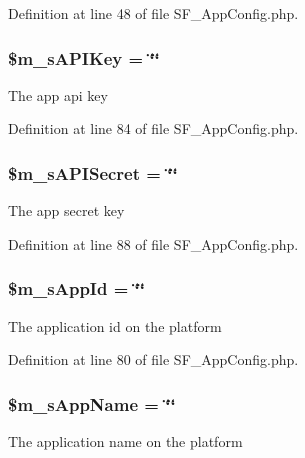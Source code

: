 Definition at line 48 of file SF\_\-AppConfig.php.

\hypertarget{classSF__AppConfig_a47530e961351765a665c4ba63e72ff3d}{
\subsubsection[{\$m\_\-sAPIKey}]{\setlength{\rightskip}{0pt plus 5cm}\$m\_\-sAPIKey = \char`\"{}\char`\"{}}}
\label{classSF__AppConfig_a47530e961351765a665c4ba63e72ff3d}
The app api key 

Definition at line 84 of file SF\_\-AppConfig.php.

\hypertarget{classSF__AppConfig_ad25b743c1731f4d58b617a193538c2b0}{
\subsubsection[{\$m\_\-sAPISecret}]{\setlength{\rightskip}{0pt plus 5cm}\$m\_\-sAPISecret = \char`\"{}\char`\"{}}}
\label{classSF__AppConfig_ad25b743c1731f4d58b617a193538c2b0}
The app secret key 

Definition at line 88 of file SF\_\-AppConfig.php.

\hypertarget{classSF__AppConfig_acd79de47be3cc9eb08fa4190b5d8a8bb}{
\subsubsection[{\$m\_\-sAppId}]{\setlength{\rightskip}{0pt plus 5cm}\$m\_\-sAppId = \char`\"{}\char`\"{}}}
\label{classSF__AppConfig_acd79de47be3cc9eb08fa4190b5d8a8bb}
The application id on the platform 

Definition at line 80 of file SF\_\-AppConfig.php.

\hypertarget{classSF__AppConfig_a349b224844e6202ccda4da1605f5156b}{
\subsubsection[{\$m\_\-sAppName}]{\setlength{\rightskip}{0pt plus 5cm}\$m\_\-sAppName = \char`\"{}\char`\"{}}}
\label{classSF__AppConfig_a349b224844e6202ccda4da1605f5156b}
The application name on the platform 

